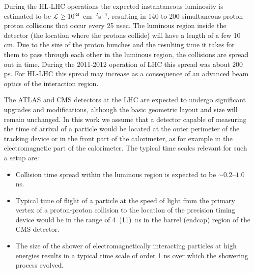 \documentclass[11pt]{article}
\begin{document}
During the HL-LHC operations the expected instantaneous luminosity is estimated
to be $\mathcal{L}\geq$10$^{34}$~cm$^{-2}$s$^{-1}$, resulting in 140 to 200
simultaneous proton-proton collisions that occur every 25 nsec. The luminous
region inside the detector (the location where the protons collide) will have a
length of a few 10 cm. Due to the size of the proton bunches and the resulting
time it takes for them to pass through each other in the luminous region, the
collisions are spread out in time. During the 2011-2012 operation of LHC this
spread was about 200 ps. For HL-LHC this spread may increase as a consequence of
an advanced beam optics of the interaction region. 

The ATLAS and CMS detectors at the LHC are expected to undergo significant
upgrades and modifications, although the basic geometric layout and size will
remain unchanged. In this work we assume that a detector capable of measuring
the time of arrival of a particle would be located at the outer perimeter of the
tracking device or in the front part of the calorimeter, as for example in the
electromagnetic part of the calorimeter. The typical time scales relevant for
such a setup are: 

\begin{itemize}
  \item Collision time spread within the luminous region is expected to be
        $\sim0.2$--$1.0$ ns.
  \item Typical time of flight of a particle at the speed of light from the
        primary vertex of a proton-proton collision to the location of the
        precision timing device would be in the range of 4~(11)~ns in the barrel
        (endcap) region of the CMS detector.
  \item The size of the shower of electromagnetically interacting particles at
        high energies results in a typical time scale of order 1 ns over which
        the showering process evolved. 
\end{itemize} 
\end{document}

